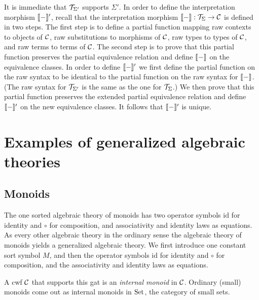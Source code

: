 \documentclass{lmcs}
\def\id{\mathrm{id}}
\begin{document}
\begin{description}
It is immediate that ${\mathcal T}_{\Sigma'}$ supports $\Sigma'$. In order to define the
interpretation morphism $\llbracket - \rrbracket'$, recall that the interpretation morphism $\llbracket - \rrbracket : {\mathcal T}_\Sigma \to {\mathcal C}$ is defined in two steps. The first step is to define a partial function mapping raw contexts to objects of ${\mathcal C}$, raw substitutions to morphisms of ${\mathcal C}$, raw types to types of ${\mathcal C}$, and raw terms to terms of ${\mathcal C}$. The second step is to prove that this partial function preserves the partial equivalence relation and define $\llbracket - \rrbracket$ on the equivalence classes. In order to define $\llbracket - \rrbracket'$ we first define the partial function on the raw syntax to be identical to the partial function on the raw syntax for $\llbracket - \rrbracket$. (The raw syntax for ${\mathcal T}_{\Sigma'}$ is the same as the one for ${\mathcal T}_\Sigma$.) We then prove that this partial function preserves the extended partial equivalence relation and define $\llbracket - \rrbracket'$ on the new equivalence classes. It follows that $\llbracket - \rrbracket'$ is unique.\end{description}

\section{Examples of generalized algebraic theories}

\subsection{Monoids} The one sorted algebraic theory of monoids has two operator symbols  $\id$ for identity and $\circ$ for composition, and associativity and identity laws as equations. As every other algebraic theory in the ordinary sense the algebraic theory of monoids yields a generalized algebraic theory. We first introduce one constant sort symbol $M$, and then the operator symbols $\id$ for identity and $\circ$ for composition, and the associativity and identity laws as equations. 

A cwf ${\mathcal C}$ that supports this gat is an {\em internal monoid} in ${\mathcal C}$. Ordinary (small) monoids come out as internal monoids in ${\rm Set}$, the category of small sets.
\end{document}
